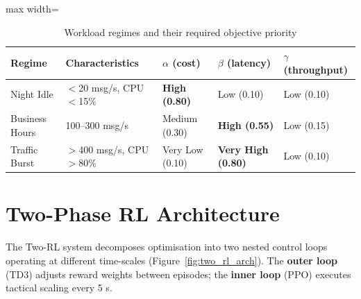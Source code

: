 \begin{table}[H]
\centering
\caption{Workload regimes and their required objective priority}
\label{tab:workload_regimes}
\begin{adjustbox}{max width=\textwidth}
\begin{tabular}{p{2.2cm}p{3.7cm}p{2.2cm}p{2.4cm}p{2.5cm}}
\toprule
\textbf{Regime} & \textbf{Characteristics} & \textbf{$\alpha$ (cost)} &
  \textbf{$\beta$ (latency)} & \textbf{$\gamma$ (throughput)} \\
\midrule
Night Idle      & $<$20 msg/s, CPU $<$15\%  & \textbf{High (0.80)} & Low (0.10) & Low (0.10) \\
Business Hours  & 100--300 msg/s            & Medium (0.30) & \textbf{High (0.55)} & Low (0.15) \\
Traffic Burst   & $>$400 msg/s, CPU $>$80\% & Very Low (0.10) & \textbf{Very High (0.80)} & Low (0.10) \\
\bottomrule
\end{tabular}
\end{adjustbox}
\end{table}

\section{Two-Phase RL Architecture}
\label{sec:arch_overview}
The Two-RL system decomposes optimisation into two nested control loops operating at
different time-scales (Figure~\ref{fig:two_rl_arch}). The \textbf{outer loop} (TD3)
adjusts reward weights between episodes; the \textbf{inner loop} (PPO) executes
tactical scaling every 5 s.

